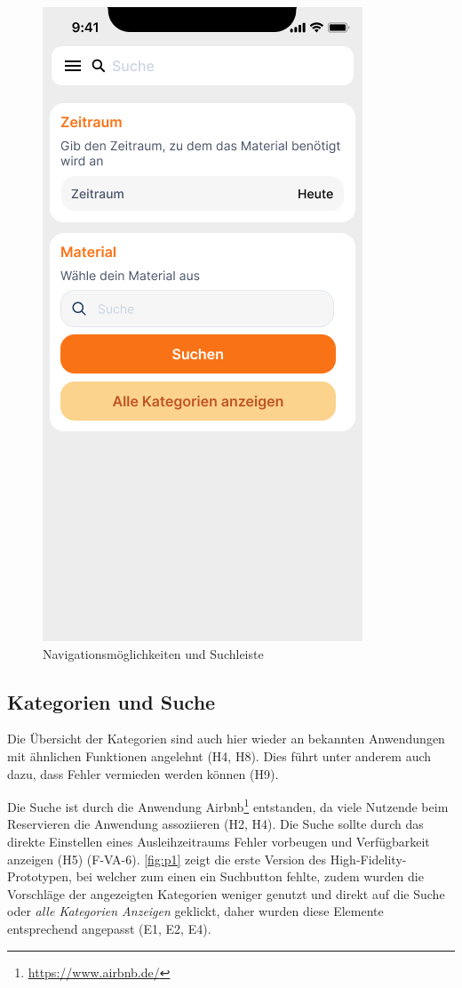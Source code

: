 \begin{figure}[h]
    \includegraphics[scale=0.3]{Bilder/Prototyp/Neu/Suche V2.png}
    \caption[-]{Navigationsmöglichkeiten und Suchleiste}
    \label{fig:nav}
\end{figure}

\subsection{Kategorien und Suche}
Die Übersicht der Kategorien sind auch hier wieder an bekannten Anwendungen mit ähnlichen Funktionen
angelehnt (H4, H8). Dies führt unter anderem auch dazu, dass Fehler vermieden werden können (H9).

Die Suche ist durch die Anwendung Airbnb\footnote{\url{https://www.airbnb.de/}} entstanden, da viele
Nutzende beim Reservieren die Anwendung assoziieren (H2, H4). Die Suche sollte durch das direkte
Einstellen eines Ausleihzeitraums Fehler vorbeugen und Verfügbarkeit anzeigen (H5) (F-VA-6).
\ref{fig:p1} zeigt die erste Version des High-Fidelity-Prototypen, bei welcher zum einen ein
Suchbutton fehlte, zudem wurden die Vorschläge der angezeigten Kategorien weniger genutzt und
direkt auf die Suche oder \textit{alle Kategorien Anzeigen} geklickt, daher wurden diese
Elemente entsprechend angepasst (E1, E2, E4).

